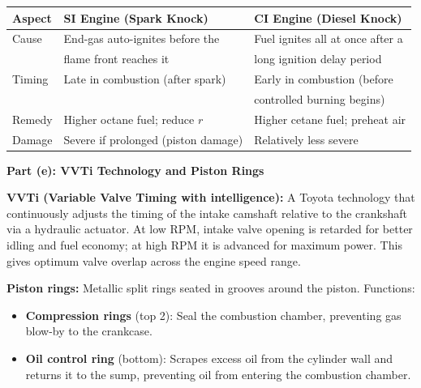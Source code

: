 \documentclass[12pt,a3paper]{article}
\begin{document}
\begin{enumerate}
\begin{tcolorbox}[enhanced,breakable,ansbox,colback=cB!4,colframe=cB,
  boxrule=0.8pt,arc=5pt,
  title={\textbf{Answer}},fonttitle=\bfseries\color{white},colbacktitle=cB]
\begin{center}
\small
\begin{tabular}{@{}lll@{}}
\toprule
\textbf{Aspect}   & \textbf{SI Engine (Spark Knock)}        & \textbf{CI Engine (Diesel Knock)} \\
\midrule
Cause             & End-gas auto-ignites before the          & Fuel ignites all at once after a \\
                  & flame front reaches it                   & long ignition delay period \\
Timing            & Late in combustion (after spark)         & Early in combustion (before \\
                  &                                          & controlled burning begins) \\
Remedy            & Higher octane fuel; reduce $r$           & Higher cetane fuel; preheat air \\
Damage            & Severe if prolonged (piston damage)      & Relatively less severe \\
\bottomrule
\end{tabular}
\end{center}

\hrulefill

\textbf{Part (e): VVTi Technology and Piston Rings}

\textbf{VVTi (Variable Valve Timing with intelligence):} A Toyota technology
that continuously adjusts the timing of the intake camshaft relative to the
crankshaft via a hydraulic actuator. At low RPM, intake valve opening is
retarded for better idling and fuel economy; at high RPM it is advanced for
maximum power. This gives optimum valve overlap across the engine speed range.

\textbf{Piston rings:} Metallic split rings seated in grooves around the piston.
Functions:
\begin{itemize}[leftmargin=1.5em,itemsep=1pt]
  \item \textbf{Compression rings} (top 2): Seal the combustion chamber,
        preventing gas blow-by to the crankcase.
  \item \textbf{Oil control ring} (bottom): Scrapes excess oil from the cylinder
        wall and returns it to the sump, preventing oil from entering the
        combustion chamber.
\end{itemize}

\end{tcolorbox}


\end{enumerate}
\end{document}
